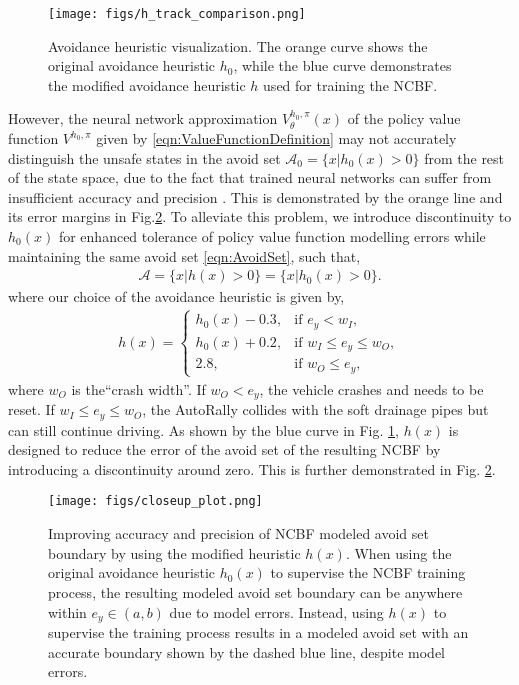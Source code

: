 \begin{figure}[!h]
    \centering
    \centerline{\texttt{[image: figs/h\_track\_comparison.png]}}
    \caption{Avoidance heuristic visualization. The orange curve shows the original avoidance heuristic $h_0$, while the blue curve demonstrates the modified avoidance heuristic $h$ used for training the NCBF.}
    \label{fig:AvoidanceHeuristicVisualization}
\end{figure}
However, the neural network approximation $V_\theta^{h_0, \pi}(x)$ of the policy value function $V^{h_0, \pi}$ given by \eqref{eqn:ValueFunctionDefinition} may not accurately distinguish the unsafe states in the avoid set $\mathcal{A}_0 = \{x|h_0(x) > 0 \}$ from the rest of the state space, due to the fact that trained neural networks can suffer from insufficient accuracy and precision \cite{jiang2023neural, de2018high}. This is demonstrated by the orange line and its error margins in Fig.\ref{fig:closeup_plot}. To alleviate this problem, we introduce discontinuity to $h_0(x)$ for enhanced tolerance of policy value function modelling errors while maintaining the same avoid set \eqref{eqn:AvoidSet}, such that,
\begin{align}
    \mathcal{A} = \{x|h(x) > 0 \} = \{x|h_0(x) > 0 \}.
\end{align}
where our choice of the avoidance heuristic is given by,
\begin{align}
h(x) = 
\begin{cases} 
h_0(x) - 0.3, & \text{if } e_y < w_I, \\
h_0(x) + 0.2, & \text{if } w_I \leq e_y \leq w_O,\\
2.8, & \text{if } w_O \leq e_y,
\end{cases}
\end{align}
where $w_O$ is the``crash width''. If $w_O < e_y$, the vehicle crashes and needs to be reset. If $ w_I \leq e_y \leq w_O$, the AutoRally collides with the soft drainage pipes but can still continue driving. 
As shown by the blue curve in Fig. \ref{fig:AvoidanceHeuristicVisualization}, $h(x)$ is designed to reduce the error of the avoid set of the resulting NCBF by introducing a discontinuity around zero. This is further demonstrated in Fig. \ref{fig:closeup_plot}.
\begin{figure}[!h]
    \centering
    \centerline{\texttt{[image: figs/closeup\_plot.png]}}
    \caption{Improving accuracy and precision of NCBF modeled avoid set boundary by using the modified heuristic $h(x)$. When using the original avoidance heuristic $h_0(x)$ to supervise the NCBF training process, the resulting modeled avoid set boundary can be anywhere within $e_y \in (a, b)$ due to model errors. Instead, using $h(x)$ to supervise the training process results in a modeled avoid set with an accurate boundary shown by the dashed blue line, despite model errors.}
    \label{fig:closeup_plot}
\end{figure}

